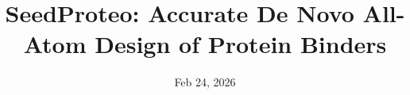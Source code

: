 \documentclass[]{bytedance_seed}
\title{SeedProteo: Accurate De Novo All-Atom Design of Protein Binders}
\affiliation[1]{ByteDance Seed}
\date{Feb 24, 2026}
\begin{document}
\maketitle









\clearpage


% 


\clearpage

\beginappendix


\end{document}
